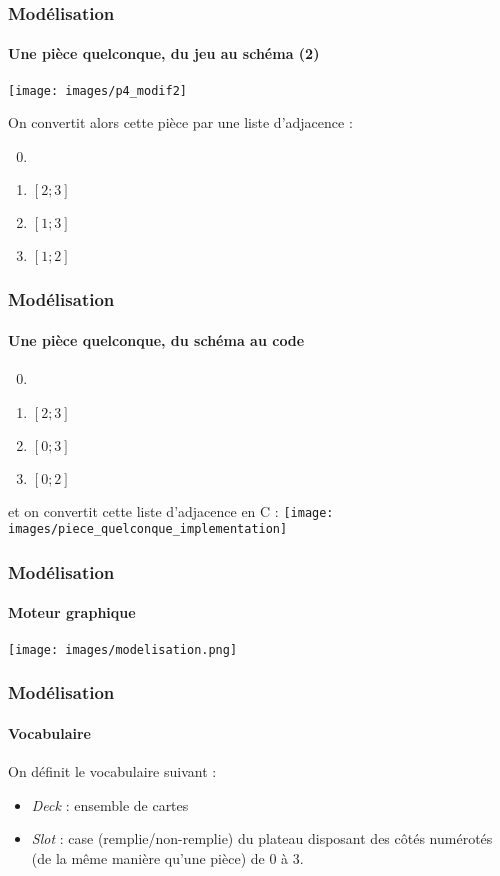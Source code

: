 \documentclass{beamer}
\begin{document}
\begin{frame}
    \frametitle{Modélisation}
    \framesubtitle{Une pièce quelconque, du jeu au schéma (2)}
			\begin{center}
				\texttt{[image: images/p4\_modif2]}
			\end{center}
			
				On convertit alors cette pièce par une liste d'adjacence : 
				\begin{enumerate}
					\setcounter{enumi}{-1}
					\item 
					\item $[2 ; 3 ]$
					\item $[1 ; 3 ]$
					\item $[1 ; 2 ]$
				\end{enumerate}
				
				
			
\end{frame}

\begin{frame}
	\frametitle{Modélisation}
	\framesubtitle{Une pièce quelconque, du schéma au code}
		\begin{enumerate}
					\setcounter{enumi}{-1}
					\item 
					\item $[ 2 ;  3 ]$
					\item $[ 0; 3 ]$
					\item $[0 ; 2]$
		\end{enumerate}
		et on convertit cette liste d'adjacence en C : 
		\texttt{[image: images/piece\_quelconque\_implementation]}
\end{frame}


	
	\begin{frame}
		\frametitle{Modélisation}
		\framesubtitle{Moteur graphique}
			\begin{center}
				\texttt{[image: images/modelisation.png]}
			\end{center}
	\end{frame}
	
	


\begin{frame}
	\frametitle{Modélisation}
	\framesubtitle{Vocabulaire}
		On définit le vocabulaire suivant : 
		\begin{itemize}
			\item \textit{Deck} : ensemble de cartes
			\item \textit{Slot} : case (remplie/non-remplie) du plateau disposant des côtés numérotés (de la même manière qu'une pièce) de $0$ à $3$.
		\end{itemize}
\end{frame}
\end{document}
